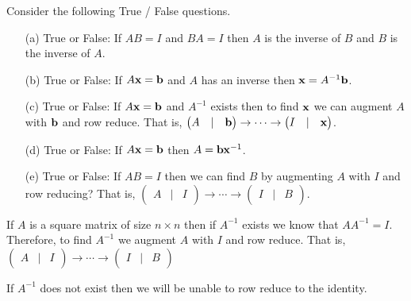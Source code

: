 \begin{problem}
    Consider the following True / False questions.
    \begin{enumerate}
        \item[(a)] True or False: If $AB = I$ and $BA = I$ then $A$ is the inverse of $B$
            and $B$ is the inverse of $A$. 
        \item[(b)] True or False: If $A{\bf x} = {\bf b}$ and $A$ has an inverse then ${\bf x} =
            A^{-1} {\bf b}$.
        \item[(c)] True or False: If $A {\bf x} = {\bf b}$ and $A^{-1}$ exists then to find ${\bf x}$ we can augment $A$
            with ${\bf b}$ and row reduce.  That is, $\begin{pmatrix} A & | & {\bf b}
            \end{pmatrix} \to \cdots \to \begin{pmatrix} I & | & {\bf x}
            \end{pmatrix}$.
        \item[(d)] True or False: If $A {\bf x} = {\bf b}$ then $A = {\bf b} {\bf x}^{-1}$.
        \item[(e)] True or False: If $AB = I$ then we can find $B$ by augmenting $A$ with $I$ and row
            reducing?  That is, $\begin{pmatrix} A & | & I \end{pmatrix} \to \cdots \to
            \begin{pmatrix} I & | & B \end{pmatrix}$. 
    \end{enumerate}
\end{problem}

\begin{technique}
    If $A$ is a square matrix of size $n \times n$ then if $A^{-1}$ exists we know that
    $AA^{-1} = I$.  Therefore, to find $A^{-1}$ we augment $A$ with $I$ and row reduce.
    That is, $\begin{pmatrix} A & | & I \end{pmatrix} \to \cdots \to \begin{pmatrix} I & |
        & B \end{pmatrix}$

    If $A^{-1}$ does not exist then we will be unable to row reduce to the identity.
\end{technique}

